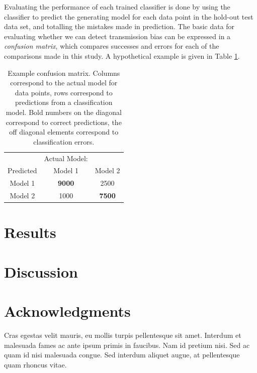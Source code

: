 \documentclass[10pt,letterpaper]{article}
\begin{document}
Evaluating the performance of each trained classifier is done by using the classifier to predict the generating model for each data point in the hold-out test data set, and totalling the mistakes made in prediction.  The basic data for evaluating whether we can detect transmission bias can be expressed in a \emph{confusion matrix}, which compares successes and errors for each of the comparisons made in this study.  A hypothetical example is given in Table
\ref{tab:confusion-matrix}. 

\begin{table}[ht]
\begin{tabular}{c|cc}
 & Actual Model: & \\
 Predicted &  Model 1 & Model  2 \\
  \hline
 Model  1 & \textbf{9000} & 2500 \\
   Model  2 & 1000 & \textbf{7500} \\
\end{tabular}
    \caption{Example confusion matrix.  Columns correspond to the actual model for data points, rows correspond to predictions from a classification model.  Bold numbers on the diagonal correspond to correct predictions, the off diagonal elements correspond to classification errors.}
    \label{tab:confusion-matrix}
\end{table}







\section{Results}\label{results}


\section{Discussion}\label{discussion}


\section*{Acknowledgments}
Cras egestas velit mauris, eu mollis turpis pellentesque sit amet. Interdum et malesuada fames ac ante ipsum primis in faucibus. Nam id pretium nisi. Sed ac quam id nisi malesuada congue. Sed interdum aliquet augue, at pellentesque quam rhoncus vitae.

\nolinenumbers

%
%
% 

\end{document}
